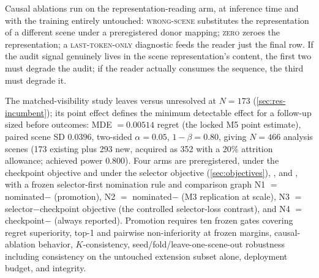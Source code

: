 Causal ablations run on the representation-reading arm, at inference time and with the training entirely untouched:
\textsc{wrong-scene} substitutes the representation of a different scene under a preregistered donor mapping;
\textsc{zero} zeroes the representation;
a \textsc{last-token-only} diagnostic feeds the \Lfull{} reader just the final row.
If the audit signal genuinely lives in the scene representation's content, the first two must degrade the audit; if the \Lfull{} reader actually consumes the sequence, the third must degrade it.

The matched-visibility study leaves \Ltok{} versus \Lgeo{} unresolved at $N{=}173$ (\cref{sec:res-incumbent}); its point effect defines the minimum detectable effect for a follow-up sized before outcomes: MDE $=0.00514$ regret (the locked M5 point estimate), paired scene SD $0.0396$, two-sided $\alpha=0.05$, $1-\beta=0.80$, giving $N=466$ analysis scenes (173 existing plus 293 new, acquired as 352 with a 20\% attrition allowance; achieved power $0.800$).
Four arms are preregistered, \Ltok{} under the checkpoint objective and under the selector objective (\cref{sec:objectives}), \Lnull, and \Lgeo, with a frozen selector-first nomination rule and comparison graph
N1 $=$ nominated$-$\Lgeo{} (promotion),
N2 $=$ nominated$-$\Lnull{} (M3 replication at scale),
N3 $=$ selector$-$checkpoint objective (the controlled selector-loss contrast), and
N4 $=$ checkpoint$-$\Lgeo{} (always reported).
Promotion requires ten frozen gates covering regret superiority, top-1 and pairwise non-inferiority at frozen margins, causal-ablation behavior, $K$-consistency, seed/fold/leave-one-scene-out robustness including consistency on the untouched extension subset alone, deployment budget, and integrity.

